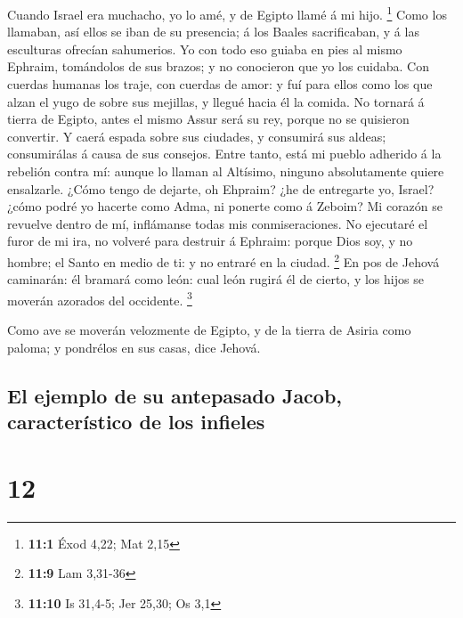  Cuando Israel era muchacho, yo lo amé, y de Egipto llamé á
mi hijo. \footnote{\textbf{11:1} Éxod 4,22; Mat 2,15}  Como
los llamaban, así ellos se iban de su presencia; á los Baales
sacrificaban, y á las esculturas ofrecían sahumerios.  Yo
con todo eso guiaba en pies al mismo Ephraim, tomándolos de sus brazos;
y no conocieron que yo los cuidaba.  Con cuerdas humanas los
traje, con cuerdas de amor: y fuí para ellos como los que alzan el yugo
de sobre sus mejillas, y llegué hacia él la comida.  No
tornará á tierra de Egipto, antes el mismo Assur será su rey, porque no
se quisieron convertir.  Y caerá espada sobre sus ciudades,
y consumirá sus aldeas; consumirálas á causa de sus consejos.
 Entre tanto, está mi pueblo adherido á la rebelión contra
mí: aunque lo llaman al Altísimo, ninguno absolutamente quiere
ensalzarle.  ¿Cómo tengo de dejarte, oh Ehpraim? ¿he de
entregarte yo, Israel? ¿cómo podré yo hacerte como Adma, ni ponerte como
á Zeboim? Mi corazón se revuelve dentro de mí, inflámanse todas mis
conmiseraciones.  No ejecutaré el furor de mi ira, no
volveré para destruir á Ephraim: porque Dios soy, y no hombre; el Santo
en medio de ti: y no entraré en la ciudad. \footnote{\textbf{11:9} Lam
  3,31-36}  En pos de Jehová caminarán: él bramará como
león: cual león rugirá él de cierto, y los hijos se moverán azorados del
occidente. \footnote{\textbf{11:10} Is 31,4-5; Jer 25,30; Os 3,1}

 Como ave se moverán velozmente de Egipto, y de la tierra
de Asiria como paloma; y pondrélos en sus casas, dice Jehová.

\hypertarget{el-ejemplo-de-su-antepasado-jacob-caracteruxedstico-de-los-infieles}{%
\subsection{El ejemplo de su antepasado Jacob, característico de los
infieles}\label{el-ejemplo-de-su-antepasado-jacob-caracteruxedstico-de-los-infieles}}

\hypertarget{section-11}{%
\section{12}\label{section-11}}

